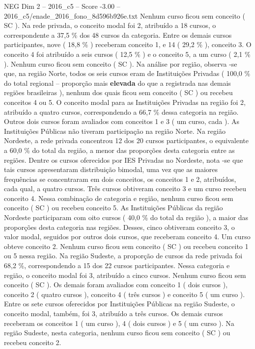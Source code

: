 \begin{textsample}{NEG Dim 2 – 2016\_c5 – Score -3.00 – 2016\_c5/enade\_2016\_fono\_8d596b926e.txt}
Nenhum curso ficou sem conceito ( SC ).
Na rede privada, o conceito modal foi 2, atribuído a 18 cursos, o correspondente a 37,5 \% dos 48 cursos da categoria.
Entre os demais cursos participantes, nove ( 18,8 \% ) receberam conceito 1, e 14 ( 29,2 \% ), conceito 3.
O conceito 4 foi atribuído a seis cursos ( 12,5 \% ) e o conceito 5, a um curso ( 2,1 \% ).
Nenhum curso ficou sem conceito ( SC ).
Na análise por região, observa -se que, na região Norte, todos os seis cursos eram de Instituições Privadas ( 100,0 \% do total regional – proporção mais \textbf{elevada} do que a registrada nas demais regiões brasileiras ), nenhum dos quais ficou sem conceito ( SC ) ou recebeu conceitos 4 ou 5.
O conceito modal para as Instituições Privadas na região foi 2, atribuído a quatro cursos, correspondendo a 66,7 \% dessa categoria na região.
Outros dois cursos foram avaliados com conceitos 1 e 3 ( um curso, cada ).
As Instituições Públicas não tiveram participação na região Norte.
Na região Nordeste, a rede privada concentrou 12 dos 20 cursos participantes, o equivalente a 60,0 \% do total da região, a menor das proporções desta categoria entre as regiões.
Dentre os cursos oferecidos por IES Privadas no Nordeste, nota -se que tais cursos apresentaram distribuição bimodal, uma vez que as maiores frequências se concentraram em dois conceitos, os conceitos 1 e 2, atribuídos, cada qual, a quatro cursos.
Três cursos obtiveram conceito 3 e um curso recebeu conceito 4.
Nessa combinação de categoria e região, nenhum curso ficou sem conceito ( SC ) ou recebeu conceito 5.
As Instituições Públicas da região Nordeste participaram com oito cursos ( 40,0 \% do total da região ), a maior das proporções desta categoria nas regiões.
Desses, cinco obtiveram conceito 3, o valor modal, seguidos por outros dois cursos, que receberam conceito 4.
Um curso obteve conceito 2.
Nenhum curso ficou sem conceito ( SC ) ou recebeu conceito 1 ou 5 nessa região.
Na região Sudeste, a proporção de cursos da rede privada foi 68,2 \%, correspondendo a 15 dos 22 cursos participantes.
Nessa categoria e região, o conceito modal foi 3, atribuído a cinco cursos.
Nenhum curso ficou sem conceito ( SC ).
Os demais foram avaliados com conceito 1 ( dois cursos ), conceito 2 ( quatro cursos ), conceito 4 ( três cursos ) e conceito 5 ( um curso ).
Entre os sete cursos oferecidos por Instituições Públicas na região Sudeste, o conceito modal, também, foi 3, atribuído a três cursos.
Os demais cursos receberam os conceitos 1 ( um curso ), 4 ( dois cursos ) e 5 ( um curso ).
Na região Sudeste, nesta categoria, nenhum curso ficou sem conceito ( SC ) ou recebeu conceito 2.

\end{textsample}
